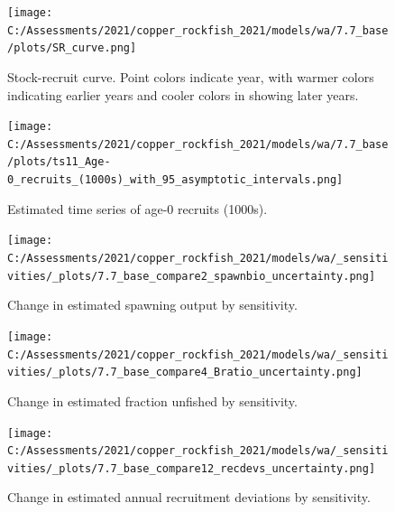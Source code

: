 \documentclass[11pt,
  english,
  a4paper,
]{article}
\begin{document}
\tagmcend\tagstructend


\begin{figure}
\centering
\texttt{[image: C:/Assessments/2021/copper\_rockfish\_2021/models/wa/7.7\_base/plots/SR\_curve.png]}
\caption{Stock-recruit curve. Point colors indicate year, with warmer colors indicating earlier years and cooler colors in showing later years.\label{fig:bh-curve}}
\end{figure}

\tagmcend\tagstructend


\begin{figure}
\centering
\texttt{[image: C:/Assessments/2021/copper\_rockfish\_2021/models/wa/7.7\_base/plots/ts11\_Age-0\_recruits\_(1000s)\_with\_95\_asymptotic\_intervals.png]}
\caption{Estimated time series of age-0 recruits (1000s).\label{fig:recruits}}
\end{figure}

\tagmcend\tagstructend


\begin{figure}
\centering
\texttt{[image: C:/Assessments/2021/copper\_rockfish\_2021/models/wa/\_sensitivities/\_plots/7.7\_base\_compare2\_spawnbio\_uncertainty.png]}
\caption{Change in estimated spawning output by sensitivity.\label{fig:sens-ssb}}
\end{figure}

\tagmcend\tagstructend


\begin{figure}
\centering
\texttt{[image: C:/Assessments/2021/copper\_rockfish\_2021/models/wa/\_sensitivities/\_plots/7.7\_base\_compare4\_Bratio\_uncertainty.png]}
\caption{Change in estimated fraction unfished by sensitivity.\label{fig:sens-depl}}
\end{figure}

\tagmcend\tagstructend


\begin{figure}
\centering
\texttt{[image: C:/Assessments/2021/copper\_rockfish\_2021/models/wa/\_sensitivities/\_plots/7.7\_base\_compare12\_recdevs\_uncertainty.png]}
\caption{Change in estimated annual recruitment deviations by sensitivity.\label{fig:sens-recr}}
\end{figure}
\end{document}
